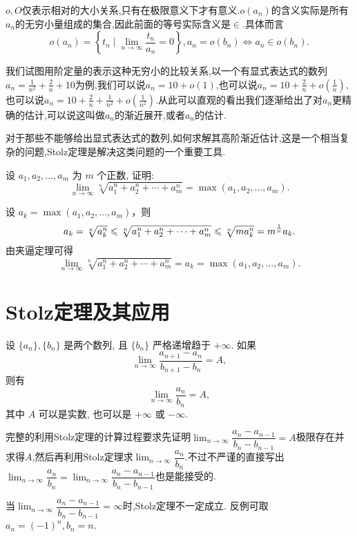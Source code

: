 $o,O$仅表示相对的大小关系,只有在极限意义下才有意义.$o(a_n)$的含义实际是所有$a_n$的无穷小量组成的集合,因此前面的等号实际含义是$\in$.具体而言
$$o(a_n) = \left\{t_n \mid \lim_{n \to \infty} \frac{t_n}{a_n} = 0\right\}, a_n = o(b_n) \Leftrightarrow a_n \in o(b_n).$$

我们试图用阶定量的表示这种无穷小的比较关系,以一个有显式表达式的数列$a_n = \frac{1}{n^2} + \frac{2}{n} + 10$为例,我们可以说$a_n = 10 + o(1)$,也可以说$a_n = 10 + \frac{2}{n} + o(\frac{1}{n})$,也可以说$a_n = 10 + \frac{2}{n} + \frac{1}{n^2} + o(\frac{1}{n^2})$.从此可以直观的看出我们逐渐给出了对$a_n$更精确的估计,可以说这叫做$a_n$的渐近展开,或者$a_n$的估计.

对于那些不能够给出显式表达式的数列,如何求解其高阶渐近估计,这是一个相当复杂的问题,Stolz定理是解决这类问题的一个重要工具.

\begin{exercise}[1.2.16]
    设 $a_1, a_2, \ldots, a_m$ 为 $m$ 个正数, 证明:
    $$
        \lim_{n\to\infty} \sqrt[n]{a_1^n + a_2^n + \cdots + a_m^n} = \max(a_1, a_2, \ldots, a_m).
    $$
\end{exercise}

\begin{solution}
    设 $a_k = \max(a_1, a_2, \ldots, a_m)$，则
    $$
        a_k = \sqrt[n]{a_k^n} \leqslant \sqrt[n]{a_1^n + a_2^n + \cdots + a_m^n} \leqslant \sqrt[n]{m a_k^n} = m^{\frac{1}{n}} a_k.
    $$
    由夹逼定理可得
    $$
        \lim_{n\to\infty} \sqrt[n]{a_1^n + a_2^n + \cdots + a_m^n} = a_k = \max(a_1, a_2, \ldots, a_m).
    $$
\end{solution}

\section{Stolz定理及其应用}

\begin{theorem} \label{thm:Stolz_inf}
    设 $\{a_n\}, \{b_n\}$ 是两个数列, 且 $\{b_n\}$ 严格递增趋于 $+\infty$. 如果
    $$ \lim_{n\to\infty} \frac{a_{n+1} - a_n}{b_{n+1} - b_n} = A, $$
    则有
    $$ \lim_{n\to\infty} \frac{a_n}{b_n} = A, $$
    其中 $A$ 可以是实数, 也可以是 $+\infty$ 或 $-\infty$.

    \begin{remark}
        完整的利用Stolz定理的计算过程要求先证明$\lim_{n \to \infty} \dfrac{a_n-a_{n-1}}{b_n-b_{n-1}}=A$极限存在并求得$A$,然后再利用Stolz定理求$\lim_{n \to \infty} \dfrac{a_n}{b_n}$.不过不严谨的直接写出$\lim_{n \to \infty} \dfrac{a_n}{b_n}=\lim_{n \to \infty} \dfrac{a_n-a_{n-1}}{b_n-b_{n-1}}$也是能接受的.
    \end{remark}

    \begin{remark}
        当$\lim_{n \to \infty} \dfrac{a_n-a_{n-1}}{b_n-b_{n-1}}= \infty$时,Stolz定理不一定成立.
        反例可取$a_n = (-1)^n, b_n = n$.
    \end{remark}
\end{theorem}


